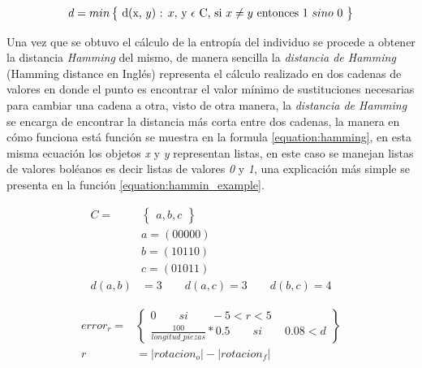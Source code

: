 \begin{equation}
d = min \begin{Bmatrix} $ d(x, $ y)$ : $ x, $ y $ \epsilon $ C, si $ x \neq y $ entonces 1 $ sino $ 0 $ \end{Bmatrix}
\label{equation:hamming}
\end{equation}

Una vez que se obtuvo el cálculo de la entropía del individuo se procede a
obtener la distancia \textit{Hamming} del mismo, de manera sencilla la
\textit{distancia de Hamming} (Hamming distance en Inglés) representa el cálculo
realizado en dos cadenas de valores en donde el punto es encontrar el valor
mínimo de sustituciones necesarias para cambiar una cadena a otra, visto de otra
manera, la \textit{distancia de Hamming} se encarga de encontrar la distancia
más corta entre dos cadenas, la manera en cómo funciona está función se muestra
en la formula \ref{equation:hamming}, en esta misma ecuación los objetos
\textit{x} y \textit{y} representan listas, en este caso se manejan listas de
valores boléanos es decir listas de valores \textit{0} y \textit{1}, una
explicación más simple se presenta en la función \ref{equation:hammin_example}.

\begin{equation}
  \begin{split}
    C = & \begin{Bmatrix} a, b, c \end{Bmatrix} \\
     & a = (00000) \\
     & b = (10110) \\
     & c = (01011) \\
     d(a, b) & = 3 \qquad d(a, c) = 3 \qquad d(b, c) = 4
  \end{split}
  \label{equation:hammin_example}
\end{equation}

\begin{equation}
  \begin{split}
    error_{r} = & 
    \begin{Bmatrix}
      0 \qquad si \qquad -5 < r < 5 \\ 
      \frac{100}{longitud\_piezas} * 0.5 \qquad si \qquad 0.08 < d
    \end{Bmatrix} \\
     r & = \left | rotacion_o \right | - \left | rotacion_f \right |
  \end{split}
  \label{equation:error_ang}
\end{equation}


